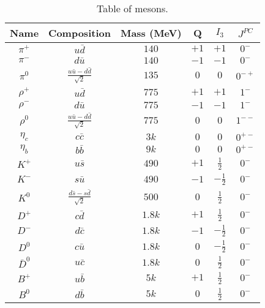 \documentclass{article}
\begin{document}
\begin{table}[h!]
    \centering
    \begin{tabular}{||c c c c c c||} 
    \hline
    Name & Composition & Mass (MeV) & Q & $I_3$ & $J^{PC}$ \\ [0.5ex] 
    \hline\hline
    $\pi^+$ & $u\bar{d}$ & $140$ & $+1$ & $+1$ & $0^{-}$ \\[1ex]
    $\pi^-$ & $d\bar{u}$ & $140$ & $-1$ & $-1$ & $0^{-}$ \\[1ex]
    $\pi^0$ & $\frac{u\bar{u}-d\bar{d}}{\sqrt{2}}$ & $135$ & $0$ & $0$ & $0^{-+}$ \\[1ex]
    $\rho^+$ & $u\bar{d}$ & $775$ & $+1$ & $+1$ & $1^{-}$ \\[1ex]
    $\rho^-$ & $d\bar{u}$ & $775$ & $-1$ & $-1$ & $1^{-}$ \\[1ex]
    $\rho^0$ & $\frac{u\bar{u}-d\bar{d}}{\sqrt{2}}$ & $775$ & $0$ & $0$ & $1^{--}$ \\[1ex]
    $\eta_c$ & $c\bar{c}$ & $3k$ & $0$ & $0$ & $0^{+-}$ \\[1ex]
    $\eta_b$ & $b\bar{b}$ & $9k$ & $0$ & $0$ & $0^{+-}$ \\[1ex]
    $K^+$ & $u\bar{s}$ & $490$ & $+1$ & $\frac{1}{2}$ & $0^{-}$ \\[1ex]
    $K^-$ & $s\bar{u}$ & $490$ & $-1$ & $-\frac{1}{2}$ & $0^{-}$ \\[1ex]
    $K^0$ & $\frac{d\bar{s}-s\bar{d}}{\sqrt{2}}$ & $500$ & $0$ & $\frac{1}{2}$ & $0^{-}$ \\[1ex]
    $D^+$ & $c\bar{d}$ & $1.8k$ & $+1$ & $\frac{1}{2}$ & $0^{-}$ \\[1ex]
    $D^-$ & $d\bar{c}$ & $1.8k$ & $-1$ & $-\frac{1}{2}$ & $0^{-}$ \\[1ex]
    $D^0$ & $c\bar{u}$ & $1.8k$ & $0$ & $-\frac{1}{2}$ & $0^{-}$ \\[1ex]
    $\bar{D}^0$ & $u\bar{c}$ & $1.8k$ & $0$ & $\frac{1}{2}$ & $0^{-}$ \\[1ex]
    $B^+$ & $u\bar{b}$ & $5k$ & $+1$ & $\frac{1}{2}$ & $0^{-}$ \\[1ex]
    $B^0$ & $d\bar{b}$ & $5k$ & $0$ & $\frac{1}{2}$ & $0^{-}$ \\[1ex]
    \hline
    \end{tabular}
    \caption{Table of mesons.}
    \label{table:mesons}
\end{table}
\end{document}

